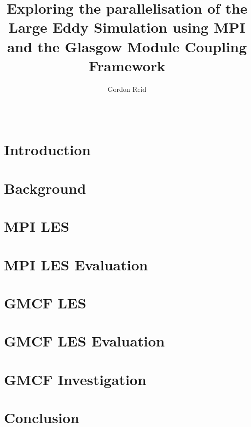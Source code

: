 \documentclass{acm_proc_article-sp}
\title{Exploring the parallelisation of the Large Eddy Simulation using MPI and
the Glasgow Module Coupling Framework}
\author{
    \alignauthor
    Gordon Reid\\
    \affaddr{School of Computing Science}\\
    \affaddr{University of Glasgow}\\
    \email{1002536r@student.gla.ac.uk}
}
\begin{document}
\maketitle

\begin{abstract}

\end{abstract}

\section{Introduction}


\section{Background}
\label{sec:Background}

\section{MPI LES}
\label{sec:MPILES}

\section{MPI LES Evaluation}
\label{sec:MPILESEval}

\section{GMCF LES}
\label{sec:GMCFLES}

\section{GMCF LES Evaluation}
\label{sec:GMCFLESEval}

\section{GMCF Investigation}
\label{sec:GMCFInvestigation}

\section{Conclusion}
\label{sec:Conclusion}



\end{document}
